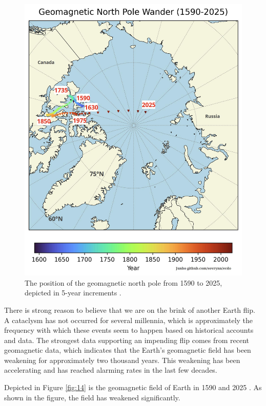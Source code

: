 \documentclass[10pt,twocolumn,letterpaper]{article}
\begin{document}
\begin{figure}[t]
\begin{center}
   \includegraphics[width=1\linewidth]{npw.jpg}
\end{center}
   \caption{The position of the geomagnetic north pole from 1590 to 2025, depicted in 5-year increments \cite{142}.}
\label{fig:13}
\label{fig:onecol}
\end{figure}

There is strong reason to believe that we are on the brink of another Earth flip. A cataclysm has not occurred for several millennia, which is approximately the frequency with which these events seem to happen based on historical accounts and data. The strongest data supporting an impending flip comes from recent geomagnetic data, which indicates that the Earth's geomagnetic field has been weakening for approximately two thousand years. This weakening has been accelerating and has reached alarming rates in the last few decades.

Depicted in Figure \ref{fig:14} is the geomagnetic field of Earth in 1590 and 2025 \cite{125,126}. As shown in the figure, the field has weakened significantly.
\end{document}
